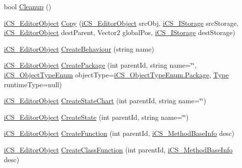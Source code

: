 \begin{DoxyCompactItemize}
\item 
bool \hyperlink{classi_c_s___i_storage_a949d4527cea08f51648c0a4db81108cd}{Cleanup} ()
\item 
\hyperlink{classi_c_s___editor_object}{i\+C\+S\+\_\+\+Editor\+Object} \hyperlink{classi_c_s___i_storage_ae850e4e4334385024d11a0d1c3d8cf2d}{Copy} (\hyperlink{classi_c_s___editor_object}{i\+C\+S\+\_\+\+Editor\+Object} src\+Obj, \hyperlink{classi_c_s___i_storage}{i\+C\+S\+\_\+\+I\+Storage} src\+Storage, \hyperlink{classi_c_s___editor_object}{i\+C\+S\+\_\+\+Editor\+Object} dest\+Parent, Vector2 global\+Pos, \hyperlink{classi_c_s___i_storage}{i\+C\+S\+\_\+\+I\+Storage} dest\+Storage)
\item 
\hyperlink{classi_c_s___editor_object}{i\+C\+S\+\_\+\+Editor\+Object} \hyperlink{classi_c_s___i_storage_ab80eaed0368be2ce674a7b3b398c5236}{Create\+Behaviour} (string name)
\item 
\hyperlink{classi_c_s___editor_object}{i\+C\+S\+\_\+\+Editor\+Object} \hyperlink{classi_c_s___i_storage_a8e7e2726e13eca048bfb45b770ccf2bf}{Create\+Package} (int parent\+Id, string name=\char`\"{}\char`\"{}, \hyperlink{i_c_s___object_type_enum_8cs_ae6c3dd6d8597380b56d94908eb431547}{i\+C\+S\+\_\+\+Object\+Type\+Enum} object\+Type=\hyperlink{i_c_s___object_type_enum_8cs_ae6c3dd6d8597380b56d94908eb431547a209802fb858e2c83205027dbbb5d9e6c}{i\+C\+S\+\_\+\+Object\+Type\+Enum.\+Package}, \hyperlink{i_c_s___object_type_enum_8cs_ae6c3dd6d8597380b56d94908eb431547aa1fa27779242b4902f7ae3bdd5c6d508}{Type} runtime\+Type=null)
\item 
\hyperlink{classi_c_s___editor_object}{i\+C\+S\+\_\+\+Editor\+Object} \hyperlink{classi_c_s___i_storage_a11edc28743fd8a837e2614febee0fa4a}{Create\+State\+Chart} (int parent\+Id, string name=\char`\"{}\char`\"{})
\item 
\hyperlink{classi_c_s___editor_object}{i\+C\+S\+\_\+\+Editor\+Object} \hyperlink{classi_c_s___i_storage_ac8a351aa4f353ba4edcb4f97f4ea495f}{Create\+State} (int parent\+Id, string name=\char`\"{}\char`\"{})
\item 
\hyperlink{classi_c_s___editor_object}{i\+C\+S\+\_\+\+Editor\+Object} \hyperlink{classi_c_s___i_storage_a832f49f4808b273d32d51f12198a1d30}{Create\+Function} (int parent\+Id, \hyperlink{classi_c_s___method_base_info}{i\+C\+S\+\_\+\+Method\+Base\+Info} desc)
\item 
\hyperlink{classi_c_s___editor_object}{i\+C\+S\+\_\+\+Editor\+Object} \hyperlink{classi_c_s___i_storage_a49ead8cae2de4cc6b29e7c723ad0ad85}{Create\+Class\+Function} (int parent\+Id, \hyperlink{classi_c_s___method_base_info}{i\+C\+S\+\_\+\+Method\+Base\+Info} desc)

\end{DoxyCompactItemize}
